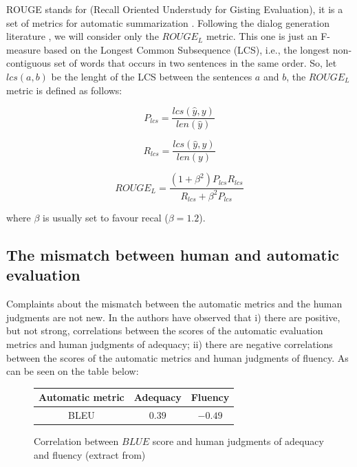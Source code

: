 ROUGE stands for (Recall Oriented Understudy for Gisting Evaluation), it is a set of metrics for automatic summarization \cite{Lin}. Following the dialog generation literature \cite{Lowe:2016}, we will consider only the $ROUGE_L$ metric. This one is just an F-measure based on the Longest Common Subsequence (LCS), i.e., the longest non-contiguous set of words that occurs in two sentences in the same order. So, let $lcs(a,b)$ be the lenght of the LCS between the sentences $a$ and $b$, the $ROUGE_L$ metric is defined as follows: 

\begin{equation}
P_{lcs} = \frac{lcs(\hat{y}, y)}{len(\hat{y})}
\end{equation}    


\begin{equation}
R_{lcs} = \frac{lcs(\hat{y}, y)}{len(y)}
\end{equation}

\begin{equation}
ROUGE_L = \frac{(1 + \beta^2) P_{lcs} R_{lcs}}{R_{lcs} + \beta^{2}P_{lcs}}
\end{equation}

where $\beta$ is usually set to favour recal ($\beta = 1.2$).

\subsection{The mismatch between human and automatic evaluation}

Complaints about the mismatch between the automatic metrics and the human judgments are not new. In  \cite{Stent} the authors have observed that i) there  are  positive,  but  not  strong,  correlations  between  the  scores  of the automatic evaluation metrics and human judgments of adequacy; ii) there are negative correlations between the scores of the automatic metrics and human judgments of fluency. As can be seen on the table below:

\begin{figure}[h]
\label{stenttable}
\begin{center}
\begin{tabular}{|c|c|c|}
\hline
\cellcolor{blue!10} Automatic metric & \cellcolor{blue!10} Adequacy & \cellcolor{blue!10} Fluency \\ \hline
BLEU & $0.39$ & $-0.49$ \\ \hline
\end{tabular}
\end{center}
\caption{Correlation between $BLUE$ score and human judgments of adequacy and fluency (extract from\cite{Stent})}
\end{figure}

